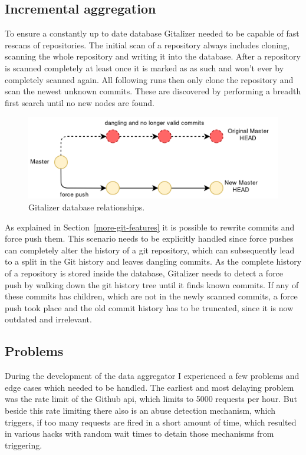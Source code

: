 \subsection{Incremental aggregation}
To ensure a constantly up to date database Gitalizer needed to be capable of fast rescans of repositories.
The initial scan of a repository always includes cloning, scanning the whole repository and writing it into the database.
After a repository is scanned completely at least once it is marked as as such and won't ever by completely scanned again.
All following runs then only clone the repository and scan the newest unknown commits.
These are discovered by performing a breadth first search until no new nodes are found.

\begin{figure}[H]
\includegraphics[scale=0.3]{./graphs/git-history-rewrite}
\centering
\caption{Gitalizer database relationships.}\label{fig:gitalizer-relationship}
\end{figure}

As explained in Section~\ref{more-git-features} it is possible to rewrite commits and force push them.
This scenario needs to be explicitly handled since force pushes can completely alter the history of a git repository, which can subsequently lead to a split in the Git history and leaves dangling commits.
As the complete history of a repository is stored inside the database, Gitalizer needs to detect a force push by walking down the git history tree until it finds known commits.
If any of these commits has children, which are not in the newly scanned commits, a force push took place and the old commit history has to be truncated, since it is now outdated and irrelevant.


\subsection{Problems}
During the development of the data aggregator I experienced a few problems and edge cases which needed to be handled.
The earliest and most delaying problem was the rate limit of the Github \ac{api}, which limits to 5000 requests per hour.
But beside this rate limiting there also is an abuse detection mechanism, which triggers, if too many requests are fired in a short amount of time, which resulted in various hacks with random wait times to detain those mechanisms from triggering.

